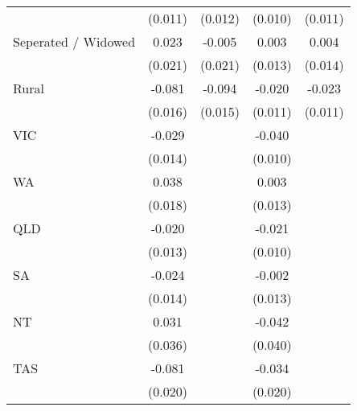 {\begin{tabular}{l*{4}{c}}
                    &     (0.011)         &     (0.012)         &     (0.010)         &     (0.011)         \\
[1em]
Seperated / Widowed &       0.023         &      -0.005         &       0.003         &       0.004         \\
                    &     (0.021)         &     (0.021)         &     (0.013)         &     (0.014)         \\
[1em]
Rural               &      -0.081\sym{***}&      -0.094\sym{***}&      -0.020         &      -0.023\sym{*}  \\
                    &     (0.016)         &     (0.015)         &     (0.011)         &     (0.011)         \\
[1em]
VIC                 &      -0.029\sym{*}  &                     &      -0.040\sym{***}&                     \\
                    &     (0.014)         &                     &     (0.010)         &                     \\
[1em]
WA                  &       0.038\sym{*}  &                     &       0.003         &                     \\
                    &     (0.018)         &                     &     (0.013)         &                     \\
[1em]
QLD                 &      -0.020         &                     &      -0.021\sym{*}  &                     \\
                    &     (0.013)         &                     &     (0.010)         &                     \\
[1em]
SA                  &      -0.024         &                     &      -0.002         &                     \\
                    &     (0.014)         &                     &     (0.013)         &                     \\
[1em]
NT                  &       0.031         &                     &      -0.042         &                     \\
                    &     (0.036)         &                     &     (0.040)         &                     \\
[1em]
TAS                 &      -0.081\sym{***}&                     &      -0.034         &                     \\
                    &     (0.020)         &                     &     (0.020)         &                     \\

\end{tabular}}
